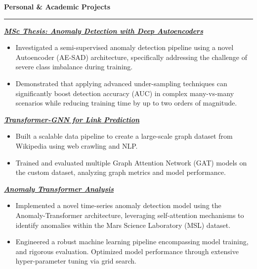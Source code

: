 \documentclass[9pt, a4paper]{article}
\newcommand{\cvsection}[1]{%
	\vspace{2pt}\par
	{\Large\bfseries\color{sectionblue}#1}\par
	\vspace{2pt}\hrule\vspace{6pt}
}
\newcommand{\cvproject}[1]{%
	\par {\large{\bfseries{\textit{#1}}}} \par \vspace{4pt}
}
\begin{document}
\begin{minipage}[t]{0.70\linewidth}
		\vspace{10pt}\par
		\cvsection{Personal \& Academic Projects}
		
		\cvproject{\href{https://github.com/bGuzzo/msc-ai-ml-thesis-anomaly-detection}{MSc Thesis: Anomaly Detection with Deep Autoencoders}}
		\begin{itemize}[leftmargin=*, nosep]
			\item \footnotesize Investigated a semi-supervised anomaly detection pipeline using a novel Autoencoder (AE-SAD) architecture, specifically addressing the challenge of severe class imbalance during training.
			
			\vspace{2pt}
			\item \footnotesize Demonstrated that applying advanced under-sampling techniques can significantly boost detection accuracy (AUC) in complex many-vs-many scenarios while reducing training time by up to two orders of magnitude.
		\end{itemize}
		
		\vspace{6pt}
		\cvproject{\href{https://github.com/bGuzzo/transformer-gnn-link-prediction}{Transformer-GNN for Link Prediction}}
		\begin{itemize}[leftmargin=*, nosep]
			\item \footnotesize Built a scalable data pipeline to create a large-scale graph dataset from Wikipedia using web crawling and NLP.
			
			\vspace{2pt}
			\item \footnotesize Trained and evaluated multiple Graph Attention Network (GAT) models on the custom dataset, analyzing graph metrics and model performance.
		\end{itemize}
		
		\vspace{6pt}
		\cvproject{\href{https://github.com/bGuzzo/Anomaly-Transformer-Analysis}{Anomaly Transformer Analysis}}
		\begin{itemize}[leftmargin=*, nosep]
			\item \footnotesize Implemented a novel time-series anomaly detection model using the Anomaly-Transformer architecture, leveraging self-attention mechanisms to identify anomalies within the Mars Science Laboratory (MSL) dataset.
			
			\vspace{2pt}
			\item \footnotesize Engineered a robust machine learning pipeline encompassing model training, and rigorous evaluation. Optimized model performance through extensive hyper-parameter tuning via grid search.
		\end{itemize}
			

\end{minipage}
\end{document}

